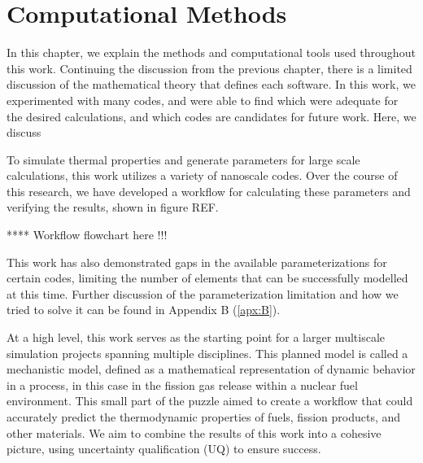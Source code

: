 
\chapter{Computational Methods}\label{chap:methods}

In this chapter, we explain the methods and computational tools used throughout this work. Continuing the discussion from the previous chapter, there is a limited discussion of the mathematical theory that defines each software. In this work, we experimented with many codes, and were able to find which were adequate for the desired calculations, and which codes are candidates for future work. Here, we discuss 

To simulate thermal properties and generate parameters for large scale calculations, this work utilizes a variety of nanoscale codes. Over the course of this research, we have developed a workflow for calculating these parameters and verifying the results, shown in figure REF.

**** Workflow flowchart here !!!

This work has also demonstrated gaps in the available parameterizations for certain codes, limiting the number of elements that can be successfully modelled at this time. Further discussion of the parameterization limitation and how we tried to solve it can be found in Appendix B (\ref{apx:B}).

At a high level, this work serves as the starting point for a larger multiscale simulation projects spanning multiple disciplines. This planned model is called a mechanistic model, defined as a mathematical representation of dynamic behavior in a process, in this case in the fission gas release within a nuclear fuel environment. This small part of the puzzle aimed to create a workflow that could accurately predict the thermodynamic properties of fuels, fission products, and other materials. We aim to combine the results of this work into a cohesive picture, using uncertainty qualification (UQ) to ensure success.


